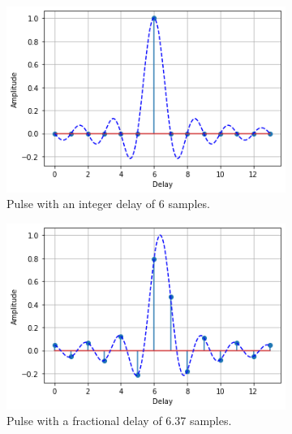 \begin{figure}
	\centering
	\begin{subfigure}{.45\linewidth}
		\includegraphics[width=\linewidth]{./figures/screenshots/Fractional_delay_6}
		\caption{Pulse with an integer delay of 6 samples.}
	\end{subfigure}
	\hskip 5mm
	\begin{subfigure}{.45\linewidth}
		\includegraphics[width=\linewidth]{./figures/screenshots/Fractional_delay_637}
		\caption{Pulse with a fractional delay of 6.37 samples.}
	\end{subfigure}
	\caption{\label{fig:fractional-delay-sinc-plot}}
\end{figure}

